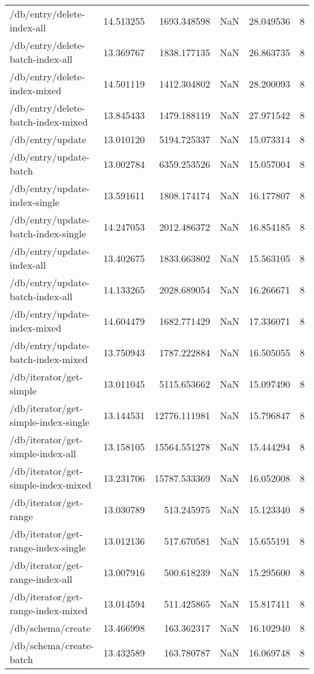 \begin{longtable}{lrrrrr}
/db/entry/delete-index-all & 14.513255 & 1693.348598 & NaN & 28.049536 & 8 \\
/db/entry/delete-batch-index-all & 13.369767 & 1838.177135 & NaN & 26.863735 & 8 \\
/db/entry/delete-index-mixed & 14.501119 & 1412.304802 & NaN & 28.200093 & 8 \\
/db/entry/delete-batch-index-mixed & 13.845433 & 1479.188119 & NaN & 27.971542 & 8 \\
/db/entry/update & 13.010120 & 5194.725337 & NaN & 15.073314 & 8 \\
/db/entry/update-batch & 13.002784 & 6359.253526 & NaN & 15.057004 & 8 \\
/db/entry/update-index-single & 13.591611 & 1808.174174 & NaN & 16.177807 & 8 \\
/db/entry/update-batch-index-single & 14.247053 & 2012.486372 & NaN & 16.854185 & 8 \\
/db/entry/update-index-all & 13.402675 & 1833.663802 & NaN & 15.563105 & 8 \\
/db/entry/update-batch-index-all & 14.133265 & 2028.689054 & NaN & 16.266671 & 8 \\
/db/entry/update-index-mixed & 14.604479 & 1682.771429 & NaN & 17.336071 & 8 \\
/db/entry/update-batch-index-mixed & 13.750943 & 1787.222884 & NaN & 16.505055 & 8 \\
/db/iterator/get-simple & 13.011045 & 5115.653662 & NaN & 15.097490 & 8 \\
/db/iterator/get-simple-index-single & 13.144531 & 12776.111981 & NaN & 15.796847 & 8 \\
/db/iterator/get-simple-index-all & 13.158105 & 15564.551278 & NaN & 15.444294 & 8 \\
/db/iterator/get-simple-index-mixed & 13.231706 & 15787.533369 & NaN & 16.052008 & 8 \\
/db/iterator/get-range & 13.030789 & 513.245975 & NaN & 15.123340 & 8 \\
/db/iterator/get-range-index-single & 13.012136 & 517.670581 & NaN & 15.655191 & 8 \\
/db/iterator/get-range-index-all & 13.007916 & 500.618239 & NaN & 15.295600 & 8 \\
/db/iterator/get-range-index-mixed & 13.014594 & 511.425865 & NaN & 15.817411 & 8 \\
/db/schema/create & 13.466998 & 163.362317 & NaN & 16.102940 & 8 \\
/db/schema/create-batch & 13.432589 & 163.780787 & NaN & 16.069748 & 8 \\

\end{longtable}
